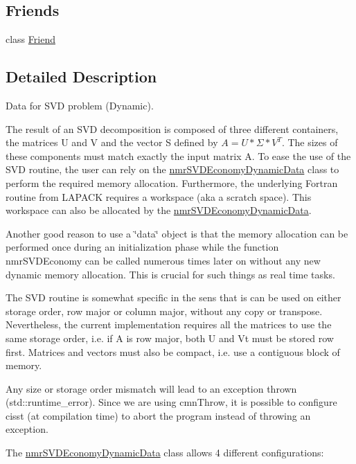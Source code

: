 \subsection*{Friends}
\begin{DoxyCompactItemize}
\item 
class \hyperlink{classnmr_s_v_d_economy_dynamic_data_a7f8321d57e81bc613d5dbef3410ba70e}{Friend}
\end{DoxyCompactItemize}


\subsection{Detailed Description}
Data for S\+V\+D problem (Dynamic). 

The result of an S\+V\+D decomposition is composed of three different containers, the matrices U and V and the vector S defined by $ A = U * \Sigma * V^{T} $. The sizes of these components must match exactly the input matrix A. To ease the use of the S\+V\+D routine, the user can rely on the \hyperlink{classnmr_s_v_d_economy_dynamic_data}{nmr\+S\+V\+D\+Economy\+Dynamic\+Data} class to perform the required memory allocation. Furthermore, the underlying Fortran routine from L\+A\+P\+A\+C\+K requires a workspace (aka a scratch space). This workspace can also be allocated by the \hyperlink{classnmr_s_v_d_economy_dynamic_data}{nmr\+S\+V\+D\+Economy\+Dynamic\+Data}.

Another good reason to use a \char`\"{}data\char`\"{} object is that the memory allocation can be performed once during an initialization phase while the function nmr\+S\+V\+D\+Economy can be called numerous times later on without any new dynamic memory allocation. This is crucial for such things as real time tasks.

The S\+V\+D routine is somewhat specific in the sens that is can be used on either storage order, row major or column major, without any copy or transpose. Nevertheless, the current implementation requires all the matrices to use the same storage order, i.\+e. if A is row major, both U and Vt must be stored row first. Matrices and vectors must also be compact, i.\+e. use a contiguous block of memory.

Any size or storage order mismatch will lead to an exception thrown (std\+::runtime\+\_\+error). Since we are using cmn\+Throw, it is possible to configure cisst (at compilation time) to abort the program instead of throwing an exception.

The \hyperlink{classnmr_s_v_d_economy_dynamic_data}{nmr\+S\+V\+D\+Economy\+Dynamic\+Data} class allows 4 different configurations\+:


